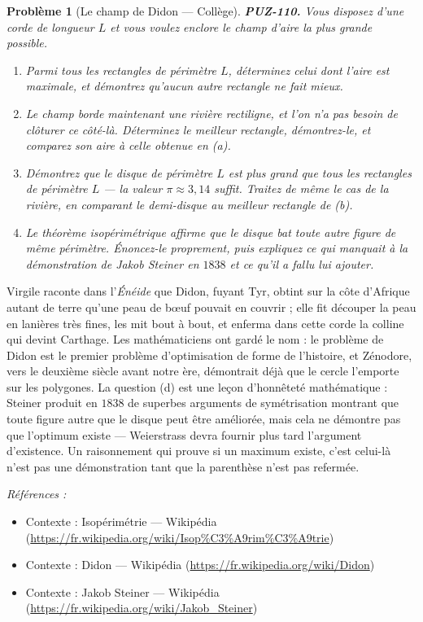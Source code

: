 \documentclass[11pt]{article}
\newtheorem{problem}{Problème}
\newenvironment{refs}{\par\small\noindent\emph{Références :}\begin{itemize}\setlength\itemsep{0pt}}{\end{itemize}\normalsize}
\begin{document}
\bigskip

\begin{problem}[{Le champ de Didon --- Collège}]
\textbf{PUZ-110.} Vous disposez d'une corde de longueur $ L $ et vous voulez enclore le
champ d'aire la plus grande possible.
\begin{enumerate}
\item[(a)] Parmi tous les rectangles de périmètre $ L $, déterminez celui dont l'aire est maximale,
et démontrez qu'aucun autre rectangle ne fait mieux.
\item[(b)] Le champ borde maintenant une rivière rectiligne, et l'on n'a pas besoin de clôturer ce
côté-là. Déterminez le meilleur rectangle, démontrez-le, et comparez son aire à celle
obtenue en (a).
\item[(c)] Démontrez que le disque de périmètre $ L $ est plus grand que tous les rectangles de
périmètre $ L $ --- la valeur $ \pi \approx 3{,}14 $ suffit. Traitez de même le cas de la
rivière, en comparant le demi-disque au meilleur rectangle de (b).
\item[(d)] Le théorème isopérimétrique affirme que le disque bat toute autre figure de même
périmètre. Énoncez-le proprement, puis expliquez ce qui manquait à la démonstration de Jakob
Steiner en $ 1838 $ et ce qu'il a fallu lui ajouter.
\end{enumerate}

\end{problem}

\noindent Virgile raconte dans l'\textit{Énéide} que Didon, fuyant Tyr, obtint sur la
côte d'Afrique autant de terre qu'une peau de b\oe{}uf pouvait en couvrir ; elle fit découper la
peau en lanières très fines, les mit bout à bout, et enferma dans cette corde la colline qui
devint Carthage. Les mathématiciens ont gardé le nom : le \og{} problème de Didon \fg{} est le premier
problème d'optimisation de forme de l'histoire, et Zénodore, vers le deuxième siècle avant
notre ère, démontrait déjà que le cercle l'emporte sur les polygones. La question (d) est une
leçon d'honnêteté mathématique : Steiner produit en $ 1838 $ de superbes arguments de
symétrisation montrant que toute figure autre que le disque peut être améliorée, mais cela ne
démontre pas que l'optimum existe --- Weierstrass devra fournir plus tard l'argument
d'existence. Un raisonnement qui prouve \og{} si un maximum existe, c'est celui-là \fg{} n'est pas une
démonstration tant que la parenthèse n'est pas refermée.

\begin{refs}
\item Contexte : Isopérimétrie --- Wikipédia (\url{https://fr.wikipedia.org/wiki/Isop%C3%A9rim%C3%A9trie})
\item Contexte : Didon --- Wikipédia (\url{https://fr.wikipedia.org/wiki/Didon})
\item Contexte : Jakob Steiner --- Wikipédia (\url{https://fr.wikipedia.org/wiki/Jakob_Steiner})
\end{refs}
\end{document}
